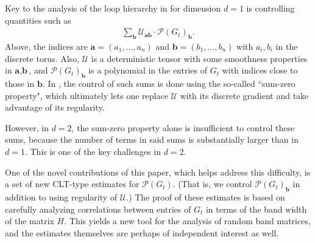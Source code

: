 Key to the analysis of the loop hierarchy in \cite{YY_25} for dimension $d=1$ is controlling quantities such as
%
\begin{align*}
\sum_{\textbf{b}}\mathcal{U}_{\textbf{a}\textbf{b}}\cdot\mathcal{P}(G_{t})_{\textbf{b}}.
\end{align*}
%
Above, the indices are $\textbf{a}=(a_{1},\ldots,a_{n})$ and $\textbf{b}=(b_{1},\ldots,b_{n})$ with $a_{i},b_{i}$ in the discrete torus. Also, $\mathcal{U}$ is a deterministic tensor with some smoothness properties in $\textbf{a},\textbf{b}$, and $\mathcal{P}(G_{t})_{\textbf{b}}$ is a polynomial in the entries of $G_{t}$ with indices close to those in $\textbf{b}$. In \cite{YY_25}, the control of such sums is done using the so-called ``sum-zero property", which ultimately lets one replace $\mathcal{U}$ with its discrete gradient and take advantage of its regularity. 

However, in $d=2$, the sum-zero property alone is insufficient to control these sums, because the number of terms in said sums is substantially larger than in $d=1$. This is one of the key challenges in $d=2$. 

One of the novel contributions of this paper, which helps address this difficulty, is a set of new CLT-type estimates for $\mathcal{P}(G_{t})$. (That is, we control $\mathcal{P}(G_{t})_{\textbf{b}}$ in addition to using regularity of $\mathcal{U}$.) The proof of these estimates is based on carefully analyzing correlations between entries of $G_{t}$ in terms of the band width of the matrix $H$. This yields a new tool for the analysis of random band matrices, and the estimates themselves are perhaps of independent interest as well.

